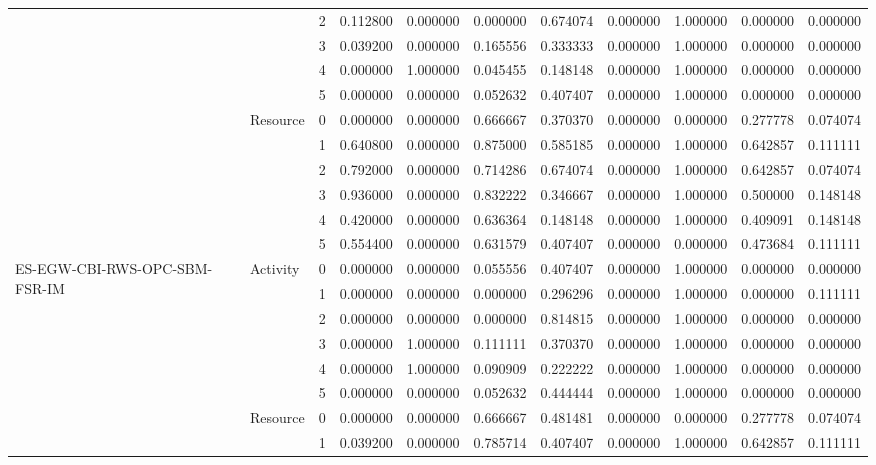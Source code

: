 \begin{tabular}{lllrrrrrrrr}
 &  & 2 & 0.112800 & 0.000000 & 0.000000 & 0.674074 & 0.000000 & 1.000000 & 0.000000 & 0.000000 \\
 &  & 3 & 0.039200 & 0.000000 & 0.165556 & 0.333333 & 0.000000 & 1.000000 & 0.000000 & 0.000000 \\
 &  & 4 & 0.000000 & 1.000000 & 0.045455 & 0.148148 & 0.000000 & 1.000000 & 0.000000 & 0.000000 \\
 &  & 5 & 0.000000 & 0.000000 & 0.052632 & 0.407407 & 0.000000 & 1.000000 & 0.000000 & 0.000000 \\
\cline{2-11}
 & \multirow[t]{6}{*}{Resource} & 0 & 0.000000 & 0.000000 & 0.666667 & 0.370370 & 0.000000 & 0.000000 & 0.277778 & 0.074074 \\
 &  & 1 & 0.640800 & 0.000000 & 0.875000 & 0.585185 & 0.000000 & 1.000000 & 0.642857 & 0.111111 \\
 &  & 2 & 0.792000 & 0.000000 & 0.714286 & 0.674074 & 0.000000 & 1.000000 & 0.642857 & 0.074074 \\
 &  & 3 & 0.936000 & 0.000000 & 0.832222 & 0.346667 & 0.000000 & 1.000000 & 0.500000 & 0.148148 \\
 &  & 4 & 0.420000 & 0.000000 & 0.636364 & 0.148148 & 0.000000 & 1.000000 & 0.409091 & 0.148148 \\
 &  & 5 & 0.554400 & 0.000000 & 0.631579 & 0.407407 & 0.000000 & 0.000000 & 0.473684 & 0.111111 \\
\cline{1-11} \cline{2-11}
\multirow[t]{12}{*}{ES-EGW-CBI-RWS-OPC-SBM-FSR-IM} & \multirow[t]{6}{*}{Activity} & 0 & 0.000000 & 0.000000 & 0.055556 & 0.407407 & 0.000000 & 1.000000 & 0.000000 & 0.000000 \\
 &  & 1 & 0.000000 & 0.000000 & 0.000000 & 0.296296 & 0.000000 & 1.000000 & 0.000000 & 0.111111 \\
 &  & 2 & 0.000000 & 0.000000 & 0.000000 & 0.814815 & 0.000000 & 1.000000 & 0.000000 & 0.000000 \\
 &  & 3 & 0.000000 & 1.000000 & 0.111111 & 0.370370 & 0.000000 & 1.000000 & 0.000000 & 0.000000 \\
 &  & 4 & 0.000000 & 1.000000 & 0.090909 & 0.222222 & 0.000000 & 1.000000 & 0.000000 & 0.000000 \\
 &  & 5 & 0.000000 & 0.000000 & 0.052632 & 0.444444 & 0.000000 & 1.000000 & 0.000000 & 0.000000 \\
\cline{2-11}
 & \multirow[t]{6}{*}{Resource} & 0 & 0.000000 & 0.000000 & 0.666667 & 0.481481 & 0.000000 & 0.000000 & 0.277778 & 0.074074 \\
 &  & 1 & 0.039200 & 0.000000 & 0.785714 & 0.407407 & 0.000000 & 1.000000 & 0.642857 & 0.111111 \\

\end{tabular}
